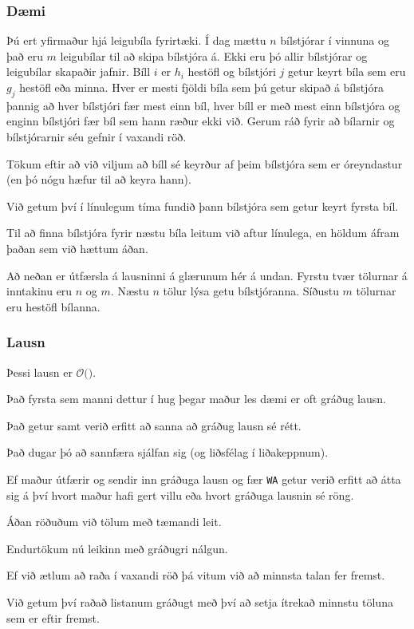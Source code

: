 {
	\frametitle{Dæmi}
	{
		\item<1-> 
			Þú ert yfirmaður hjá leigubíla fyrirtæki.
			Í dag mættu $n$ bílstjórar í vinnuna og það eru $m$ leigubílar til að skipa bílstjóra á.
			Ekki eru þó allir bílstjórar og leigubílar skapaðir jafnir.
			Bíll $i$ er $h_i$ hestöfl og bílstjóri $j$ getur keyrt bíla sem eru $g_j$ hestöfl eða minna.
			Hver er mesti fjöldi bíla sem þú getur skipað á bílstjóra
				þannig að hver bílstjóri fær mest einn bíl,
				hver bíll er með mest einn bílstjóra og
				enginn bílstjóri fær bíl sem hann ræður ekki við.
			Gerum ráð fyrir að bílarnir og bílstjórarnir séu gefnir í vaxandi röð.
		\item<2-> Tökum eftir að við viljum að bíll sé keyrður af þeim bílstjóra sem er óreyndastur (en þó nógu hæfur til að keyra hann).
		\item<3-> Við getum því í línulegum tíma fundið þann bílstjóra sem getur keyrt fyrsta bíl.
		\item<4-> Til að finna bílstjóra fyrir næstu bíla leitum við aftur línulega, en höldum áfram þaðan sem við hættum áðan.
	}
}

{
	Að neðan er útfærsla á lausninni á glærunum hér á undan. Fyrstu tvær tölurnar á inntakinu eru $n$ og $m$. 
		Næstu $n$ tölur lýsa getu bílstjóranna.
		Síðustu $m$ tölurnar eru hestöfl bílanna.
}

{
	\frametitle{Lausn}
	{
		\item<1-> Þessi lausn er $\mathcal{O}($\onslide<2->{$n + m$}$)$.
	}
}

{
	{
		\item<1-> Það fyrsta sem manni dettur í hug þegar maður les dæmi er oft gráðug lausn.
		\item<2-> Það getur samt verið erfitt að sanna að gráðug lausn sé rétt.
		\item<3-> Það dugar þó að sannfæra sjálfan sig (og liðsfélag í liðakeppnum).
		\item<4-> Ef maður útfærir og sendir inn gráðuga lausn og fær \texttt{WA}
					getur verið erfitt að átta sig á því hvort maður hafi gert villu eða hvort gráðuga lausnin sé röng.
	}
}

{
	{
		\item<1-> Áðan röðuðum við tölum með tæmandi leit.
		\item<2-> Endurtökum nú leikinn með gráðugri nálgun.
		\item<3-> Ef við ætlum að raða í vaxandi röð þá vitum við að minnsta talan fer fremst.
		\item<4-> Við getum því raðað listanum gráðugt með því að setja ítrekað minnstu töluna sem er eftir fremst.
	}
}

